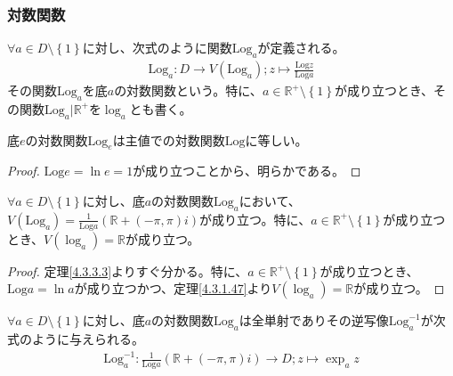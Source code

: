 \documentclass[dvipdfmx]{jsarticle}
\begin{document}
\subsubsection{対数関数}%
\begin{dfn}
$\forall a \in D \setminus \left\{ 1 \right\}$に対し、次式のように関数$\mathrm{Log}_{a}$が定義される。
\begin{align*}
\mathrm{Log}_{a}:D \rightarrow V\left( \mathrm{Log}_{a} \right);z \mapsto \frac{\mathrm{Log}z}{\mathrm{Log}a}
\end{align*}
その関数$\mathrm{Log}_{a}$を底$a$の対数関数という。特に、$a \in \mathbb{R}^{+} \setminus \left\{ 1 \right\}$が成り立つとき、その関数$\mathrm{Log}_{a}|\mathbb{R}^{+}$を$\log_{a}$とも書く。
\end{dfn}
\begin{thm}\label{4.3.3.16}
底$e$の対数関数$\mathrm{Log}_{e}$は主値での対数関数$\mathrm{Log}$に等しい。
\end{thm}
\begin{proof} $\mathrm{Log}e = \ln e = 1$が成り立つことから、明らかである。
\end{proof}
\begin{thm}\label{4.3.3.17}
$\forall a \in D \setminus \left\{ 1 \right\}$に対し、底$a$の対数関数$\mathrm{Log}_{a}$において、$V\left( \mathrm{Log}_{a} \right) = \frac{1}{\mathrm{Log}a}\left( \mathbb{R} + ( - \pi,\pi)i \right)$が成り立つ。特に、$a \in \mathbb{R}^{+} \setminus \left\{ 1 \right\}$が成り立つとき、$V\left( \log_{a} \right) = \mathbb{R}$が成り立つ。
\end{thm}
\begin{proof} 定理\ref{4.3.3.3}よりすぐ分かる。特に、$a \in \mathbb{R}^{+} \setminus \left\{ 1 \right\}$が成り立つとき、$\mathrm{Log}a = \ln a$が成り立つかつ、定理\ref{4.3.1.47}より$V\left( \log_{a} \right) = \mathbb{R}$が成り立つ。
\end{proof}
\begin{thm}\label{4.3.3.18}
$\forall a \in D \setminus \left\{ 1 \right\}$に対し、底$a$の対数関数$\mathrm{Log}_{a}$は全単射でありその逆写像$\mathrm{Log}_{a}^{- 1}$が次式のように与えられる。
\begin{align*}
\mathrm{Log}_{a}^{- 1}:\frac{1}{\mathrm{Log}a}\left( \mathbb{R} + ( - \pi,\pi)i \right) \rightarrow D;z \mapsto \exp_{a}z
\end{align*}
\end{thm}
\end{document}
